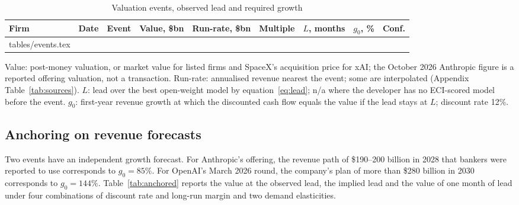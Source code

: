 \documentclass[12pt]{article}
\makeatletter
\newcommand{\tabinput}[1]{\@@input #1 }
\makeatother
\begin{document}
\begin{table}[p]
\centering
\begin{threeparttable}
\caption{Valuation events, observed lead and required growth}
\label{tab:events}
\footnotesize
\setlength{\tabcolsep}{4pt}
\begin{tabular}{lllrrrrrl}
\toprule
Firm & Date & Event & Value, \$bn & Run-rate, \$bn & Multiple & $L$, months & $g_0$, \% & Conf. \\
\midrule
\tabinput{tables/events.tex}
\bottomrule
\end{tabular}
\begin{tablenotes}\footnotesize
\item Value: post-money valuation, or market value for listed firms and SpaceX's acquisition price for xAI; the October 2026 Anthropic figure is a reported offering valuation, not a transaction. Run-rate: annualised revenue nearest the event; some are interpolated (Appendix Table~\ref{tab:sources}). $L$: lead over the best open-weight model by equation~\eqref{eq:lead}; n/a where the developer has no ECI-scored model before the event. $g_0$: first-year revenue growth at which the discounted cash flow equals the value if the lead stays at $L$; discount rate 12\%.
\end{tablenotes}
\end{threeparttable}
\end{table}

\subsection{Anchoring on revenue forecasts}

Two events have an independent growth forecast. For Anthropic's offering, the revenue path of \$190--200 billion in 2028 that bankers were reported to use corresponds to $g_0 = 85\%$. For OpenAI's March 2026 round, the company's plan of more than \$280 billion in 2030 corresponds to $g_0 = 144\%$. Table~\ref{tab:anchored} reports the value at the observed lead, the implied lead and the value of one month of lead under four combinations of discount rate and long-run margin and two demand elasticities.
\end{document}
